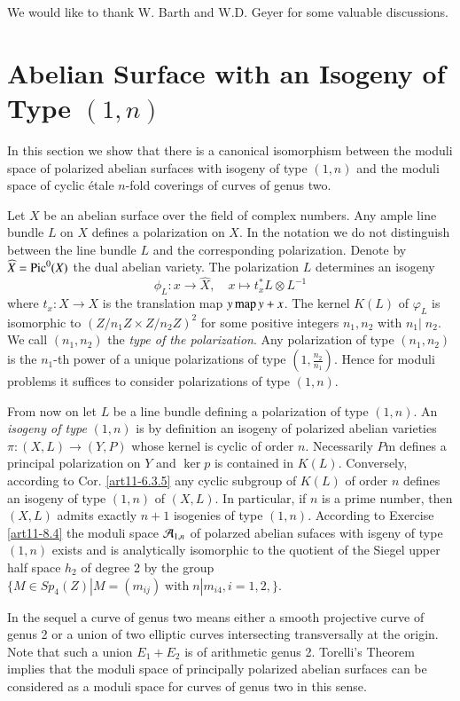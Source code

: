 We would like to thank W. Barth and W.D. Geyer for some valuable discussions.

\section{Abelian Surface with an Isogeny of Type $(1,n)$}\label{art11-sec-1}

In this section we show that there is a canonical isomorphism between the moduli space of polarized abelian surfaces with isogeny of type $(1,n)$ and the moduli space of cyclic \'etale $n$-fold coverings of curves of genus two.

Let $X$ be an abelian surface over the field of complex numbers. Any ample line bundle $L$ on $X$ defines a polarization on $X$. In the notation we do not distinguish between the line bundle $L$ and the corresponding polarization. Denote by $\widehat{X} = \operatorname{Pic}^{0}(X)$ the dual abelian variety. The polarization $L$ determines an isogeny
$$
\phi_{L}:x \rightarrow \widehat{X}, \quad x \mapsto t_{x}^{*}L \otimes L^{-1}
$$
where $t_{x}:X \rightarrow X$ is the translation map $y \operatorname{map} y +x$. The kernel $K(L)$ of $\varphi_{L}$ is isomorphic to $ (Z/n_{1} Z \times Z/n_{2}Z)^{2}$ for some positive integers $n_{1},n_{2}$ with $n_{1} |\; n_{2}$. We call $(n_{1}, n_{2})$ the \textit{type of the polarization}. Any polarization of type $(n_{1}, n_{2})$ is the $n_{1}$-th power of a unique polarizations of type $(1, \frac{n_{2}}{n_{1}})$. Hence for moduli problems it suffices to consider polarizations of type $(1,n)$.  

From now on let $L$ be a line bundle defining a polarization of type $(1,n)$. An \textit{isogeny of type} $(1,n)$ is by definition an isogeny of polarized abelian varieties $\pi : (X, L) \rightarrow (Y, P)$ whose kernel is cyclic of order $n$. Necessarily $P$m defines a principal polarization on $Y$ and $\ker p$ is contained in $K(L)$. Conversely, according to \cite{art11-keyL-B} Cor. \ref{art11-6.3.5} any cyclic subgroup of $K(L)$ of order $n$ defines an isogeny of type $(1,n)$ of $(X,L)$. In particular, if $n$ is a prime number, then $(X, L)$ admits exactly $n+1$ isogenies of type $(1,n)$. According to \cite{art11-keyL-B} Exercise \ref{art11-8.4} the moduli space $\mathcal{A}_{1,n}$  of polarzed abelian sufaces with isgeny of type $(1,n)$ exists and is analytically isomorphic to the quotient of the Siegel upper half space $h_{2}$ of degree 2 by the group $\{ M \in Sp_{4}(Z) | M=(m_{ij})\; \text{with} \; n|m_{i4}, i=1,2,\}$.

In the sequel a curve of genus two means either a smooth projective curve of genus 2 or a union of two elliptic curves intersecting transversally at the origin. Note that such a union $E_{1}+ E_{2}$ is of arithmetic genus 2. Torelli's Theorem implies that the moduli space of principally polarized abelian surfaces can be considered as a moduli space for curves of genus two in this sense.

